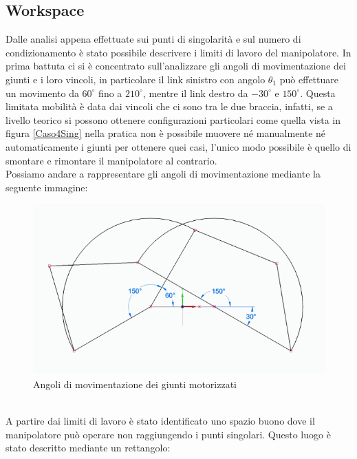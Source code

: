 \subsection{Workspace}
Dalle analisi appena effettuate sui punti di singolarità e sul numero di condizionamento è stato possibile descrivere i limiti di lavoro del manipolatore. In prima battuta ci si è concentrato sull'analizzare gli angoli di movimentazione dei giunti e i loro vincoli, in particolare il link sinistro con angolo $\theta_1$ può effettuare un movimento da $60^\circ$ fino a $210^\circ$, mentre il link destro da $-30^\circ$ e $150^\circ$. Questa limitata mobilità è data dai vincoli che ci sono tra le due braccia, infatti, se a livello teorico si possono ottenere configurazioni particolari come quella vista in figura \ref{Caso4Sing} nella pratica non è possibile muovere né manualmente né automaticamente i giunti per ottenere quei casi, l'unico modo possibile è quello di smontare e rimontare il manipolatore al contrario. \\Possiamo andare a rappresentare gli angoli di movimentazione mediante la seguente immagine: 
\begin{figure}[ht]
	\begin{center}
		\includegraphics[scale=0.56]{Immagini/Singolarity/workangle}
		\caption{Angoli di movimentazione dei giunti motorizzati}
	\end{center}
\end{figure}
\\A partire dai limiti di lavoro è stato identificato uno spazio buono dove il manipolatore può operare non raggiungendo i punti singolari. Questo luogo è stato descritto mediante un rettangolo:
